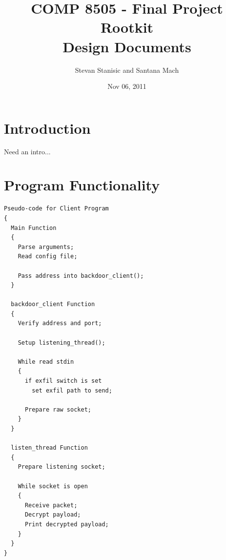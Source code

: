 \documentclass[titlepage]{article}
\begin{document}
\author{Stevan Stanisic and Santana Mach}
\title{COMP 8505 - Final Project \\ Rootkit \\ Design Documents}
\date{Nov 06, 2011}
\maketitle{}

\tableofcontents
\pagebreak

\section{Introduction}

Need an intro...

\section{Program Functionality}

\begin{lstlisting}
Pseudo-code for Client Program
{
  Main Function
  {
    Parse arguments;
    Read config file;

    Pass address into backdoor_client();
  }

  backdoor_client Function
  {
    Verify address and port;

    Setup listening_thread();

    While read stdin
    {
      if exfil switch is set
        set exfil path to send;

      Prepare raw socket;
    }
  }

  listen_thread Function
  {
    Prepare listening socket;

    While socket is open
    {
      Receive packet;
      Decrypt payload;
      Print decrypted payload;
    }
  }
}
\end{lstlisting}

\clearpage
\end{document}
